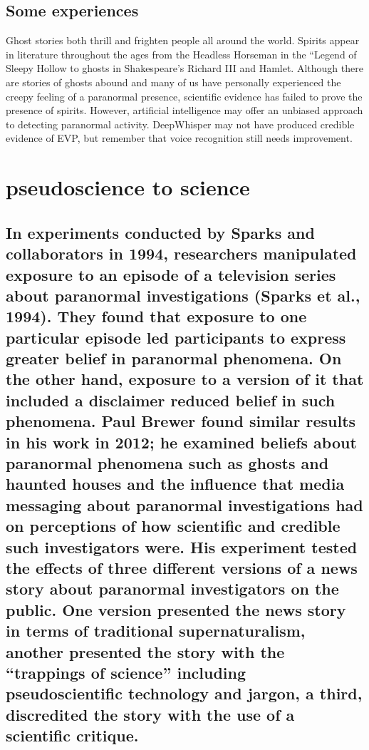 \documentclass[a4paper]{article}
\begin{document}
\subsection{Some experiences}
Ghost stories both thrill and frighten people all around the world. Spirits appear in literature throughout the ages from the Headless Horseman in the “Legend of Sleepy Hollow to ghosts in Shakespeare’s Richard III and Hamlet. Although there are stories of ghosts abound and many of us have personally experienced the creepy feeling of a paranormal presence, scientific evidence has failed to prove the presence of spirits.  However, artificial intelligence may offer an unbiased approach to detecting paranormal activity. DeepWhisper may not have produced credible evidence of EVP, but remember that voice recognition still needs improvement.

\bigskip


\section{pseudoscience to science}

\subsection{In experiments conducted by Sparks and collaborators in 1994, researchers manipulated exposure to an episode of a television series about paranormal investigations (Sparks et al., 1994). They found that exposure to one particular episode led participants to express greater belief in paranormal phenomena. On the other hand, exposure to a version of it that included a disclaimer reduced belief in such phenomena. Paul Brewer found similar results in his work in 2012; he examined beliefs about paranormal phenomena such as ghosts and haunted houses and the influence that media messaging about paranormal investigations had on perceptions of how scientific and credible such investigators were. His experiment tested the effects of three different versions of a news story about paranormal investigators on the public. One version presented the news story in terms of traditional supernaturalism, another presented the story with the “trappings of science” including pseudoscientific technology and jargon, a third, discredited the story with the use of a scientific critique.}

\bigskip

\end{document}
